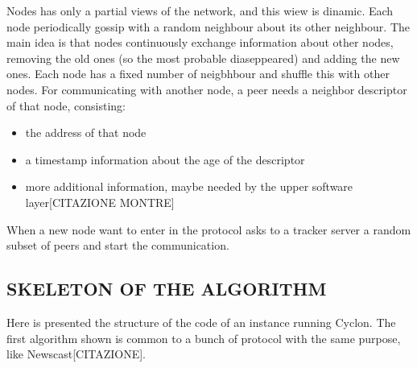 \documentclass[a4paper,12pt,notitlepage]{article} %
\begin{document}
Nodes has only a partial views of the network, and this wiew is dinamic. Each node periodically 
 gossip with a random neighbour about its other neighbour. The main idea is that nodes continuously
 exchange information about other nodes, removing the old ones (so the most probable diaseppeared) and
 adding the new ones. Each node has a fixed number of neigbhbour and shuffle this with other nodes.
 For communicating with another node, a peer needs a neighbor descriptor of that node, consisting:

 \begin{itemize}
 	\item the address of that node
 	\item a timestamp information about the age of the descriptor
 	\item more additional information, maybe needed by the upper software layer[CITAZIONE MONTRE]
 \end{itemize}

When a new node want to enter in the protocol asks to a tracker 
 server a random subset of peers and start the communication.

 \subsection{SKELETON OF THE ALGORITHM}	
Here is presented the structure of the code of an instance running Cyclon. The first algorithm shown 
 is common to a bunch of protocol with the same purpose, like Newscast[CITAZIONE].

\begin{algorithm}[H]
\SetAlgoLined
{}

\BlankLine
{}
\BlankLine

\BlankLine

\BlankLine
\end{algorithm}
\end{document}

